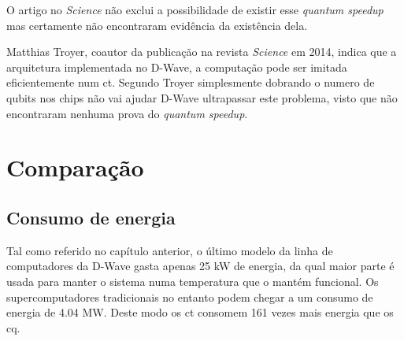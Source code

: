 \documentclass{report}
\begin{document}
\newpage
	
	O artigo no \textit{Science} não exclui a possibilidade de existir esse \emph{quantum speedup} mas certamente não encontraram evidência da existência dela.
	
	Matthias Troyer, coautor da publicação na revista \textit{Science} em 2014,  indica que a arquitetura implementada no D-Wave, a computação pode ser imitada eficientemente num \ac{ct}. Segundo Troyer simplesmente dobrando o numero de qubits nos chips não vai ajudar D-Wave ultrapassar este problema, visto que não encontraram nenhuma prova do \emph{quantum speedup}.

\begin{figure}[!h]
		\centering
		\qquad
\end{figure} 


 
\newpage

\null
\chapter{Comparação}
\label{chap.comparação}
\section{Consumo de energia}
	Tal como referido no capítulo anterior, o último modelo da linha de computadores da D-Wave gasta apenas 25 kW de energia, da qual maior parte é usada para manter o sistema numa temperatura que o mantém funcional. Os supercomputadores tradicionais no entanto podem chegar a um consumo de energia de 4.04 MW. Deste modo os \ac{ct} consomem 161 vezes mais energia que os \ac{cq}.
	
\end{document}
